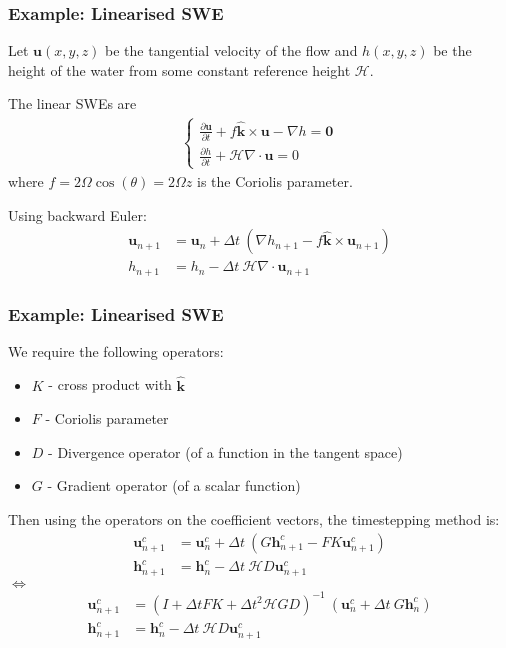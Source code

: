 \documentclass[10pt]{beamer}
\newcommand{\unitvec}{\hat{\bm{k}}}
\begin{document}
\frame
{
    \frametitle{Example: Linearised SWE}
    
Let $\mathbf{u}(x,y,z)$ be the tangential velocity of the flow and $h(x,y,z)$ be the height of the water from some constant reference height $\mathcal{H}$.

The linear SWEs are
\begin{align}
\begin{cases}
\frac{\partial \mathbf{u}}{\partial t} + f \unitvec \times \mathbf{u} - \nabla h = \mathbf{0} \\
\frac{\partial h}{\partial t} + \mathcal{H} \nabla \cdot \mathbf{u} = 0
\end{cases}
\end{align}
where $f = 2 \Omega \cos(\theta) =  2 \Omega z$ is the Coriolis parameter.

Using backward Euler:
\begin{align}
\mathbf{u}_{n+1} &= \mathbf{u}_{n} + \Delta t \: (\nabla h_{n+1} - f \unitvec \times \mathbf{u}_{n+1}) \\
h_{n+1} &= h_n - \Delta t \: \mathcal{H} \nabla \cdot \mathbf{u}_{n+1}
\end{align}
   
}

\frame
{
    \frametitle{Example: Linearised SWE}

We require the following operators:

\begin{itemize}

\item $K$ - cross product with $\unitvec$

\item $F$ - Coriolis parameter

\item $D$ - Divergence operator (of a function in the tangent space)

\item $G$ - Gradient operator (of a scalar function)

\end{itemize}

Then using the operators on the coefficient vectors, the timestepping method is: 
\begin{align}
\mathbf{u}^c_{n+1} &= \mathbf{u}^c_{n} + \Delta t \: (G \mathbf{h}^c_{n+1} - F K \mathbf{u}^c_{n+1}) \\
\mathbf{h}^c_{n+1} &= \mathbf{h}^c_n - \Delta t \: \mathcal{H} D \mathbf{u}^c_{n+1}
\end{align}
$\iff$
\begin{align}
\mathbf{u}^c_{n+1} &= (I + \Delta t F K + \Delta t^2 \mathcal{H} G D)^{-1} \: (\mathbf{u}^c_{n} + \Delta t \: G \mathbf{h}^c_n) \\
\mathbf{h}^c_{n+1} &= \mathbf{h}^c_n - \Delta t \: \mathcal{H} D \mathbf{u}^c_{n+1}
\end{align}
   
}
\end{document}
